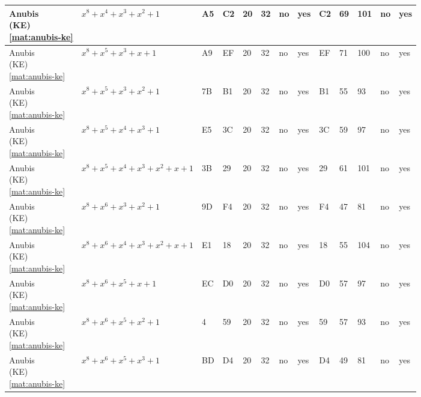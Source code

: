 \begin{tiny}
\begin{longtable}{|l|l|l|l|l|l|l|l|l|l|l|l|l|}
\shortstack{Anubis \\ (KE) \\ \eqref{mat:anubis-ke}} & $x^8 + x^4 + x^3 + x^2 + 1$ & A5 & C2 & 20 & 32 & no & yes & C2 & 69 & 101 & no & yes \\ \hline
\shortstack{Anubis \\ (KE) \\ \eqref{mat:anubis-ke}} & $x^8 + x^5 + x^3 + x + 1$ & A9 & EF & 20 & 32 & no & yes & EF & 71 & 100 & no & yes \\ \hline
\shortstack{Anubis \\ (KE) \\ \eqref{mat:anubis-ke}} & $x^8 + x^5 + x^3 + x^2 + 1$ & 7B & B1 & 20 & 32 & no & yes & B1 & 55 & 93 & no & yes \\ \hline
\shortstack{Anubis \\ (KE) \\ \eqref{mat:anubis-ke}} & $x^8 + x^5 + x^4 + x^3 + 1$ & E5 & 3C & 20 & 32 & no & yes & 3C & 59 & 97 & no & yes \\ \hline
\shortstack{Anubis \\ (KE) \\ \eqref{mat:anubis-ke}} & $x^8 + x^5 + x^4 + x^3 + x^2 + x + 1$ & 3B & 29 & 20 & 32 & no & yes & 29 & 61 & 101 & no & yes \\ \hline
\shortstack{Anubis \\ (KE) \\ \eqref{mat:anubis-ke}} & $x^8 + x^6 + x^3 + x^2 + 1$ & 9D & F4 & 20 & 32 & no & yes & F4 & 47 & 81 & no & yes \\ \hline
\shortstack{Anubis \\ (KE) \\ \eqref{mat:anubis-ke}} & $x^8 + x^6 + x^4 + x^3 + x^2 + x + 1$ & E1 & 18 & 20 & 32 & no & yes & 18 & 55 & 104 & no & yes \\ \hline
\shortstack{Anubis \\ (KE) \\ \eqref{mat:anubis-ke}} & $x^8 + x^6 + x^5 + x + 1$ & EC & D0 & 20 & 32 & no & yes & D0 & 57 & 97 & no & yes \\ \hline
\shortstack{Anubis \\ (KE) \\ \eqref{mat:anubis-ke}} & $x^8 + x^6 + x^5 + x^2 + 1$ & 4 & 59 & 20 & 32 & no & yes & 59 & 57 & 93 & no & yes \\ \hline
\shortstack{Anubis \\ (KE) \\ \eqref{mat:anubis-ke}} & $x^8 + x^6 + x^5 + x^3 + 1$ & BD & D4 & 20 & 32 & no & yes & D4 & 49 & 81 & no & yes \\ \hline

\end{longtable}
\end{tiny}
